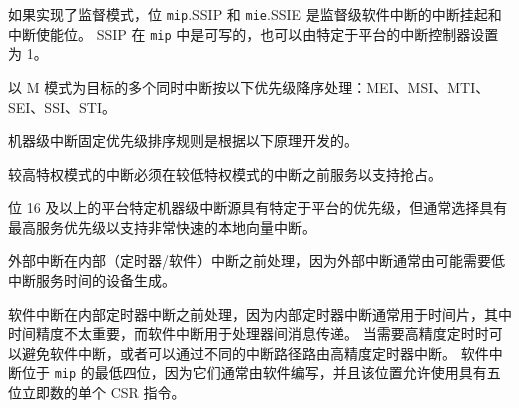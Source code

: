 如果实现了监督模式，位 {\tt mip}.SSIP 和 {\tt mie}.SSIE 是监督级软件中断的中断挂起和中断使能位。 SSIP 在 {\tt mip} 中是可写的，也可以由特定于平台的中断控制器设置为 1。

以 M 模式为目标的多个同时中断按以下优先级降序处理：MEI、MSI、MTI、SEI、SSI、STI。

\iffalse
\begin{commentary}
  The machine-level interrupt fixed-priority ordering rules were developed
  with the following rationale.

  Interrupts for higher privilege modes must be serviced before
  interrupts for lower privilege modes to support preemption.

  The platform-specific machine-level interrupt sources in bits 16 and above
  have platform-specific priority, but are typically chosen to have the
  highest service priority to support very fast local vectored interrupts.

  External interrupts are handled before internal (timer/software)
  interrupts as external interrupts are usually generated by devices
  that might require low interrupt service times.

  Software interrupts are handled before internal timer interrupts,
  because internal timer interrupts are usually intended for time
  slicing, where time precision is less important, whereas software
  interrupts are used for inter-processor messaging.  Software
  interrupts can be avoided when high-precision timing is required, or
  high-precision timer interrupts can be routed via a different
  interrupt path.
  Software interrupts are located in the lowest four bits of {\tt mip}
  as these are often written by software, and this position allows the
  use of a single CSR instruction with a five-bit immediate.
\end{commentary}
\fi

\begin{commentary}

机器级中断固定优先级排序规则是根据以下原理开发的。

较高特权模式的中断必须在较低特权模式的中断之前服务以支持抢占。

位 16 及以上的平台特定机器级中断源具有特定于平台的优先级，但通常选择具有最高服务优先级以支持非常快速的本地向量中断。

外部中断在内部（定时器/软件）中断之前处理，因为外部中断通常由可能需要低中断服务时间的设备生成。

软件中断在内部定时器中断之前处理，因为内部定时器中断通常用于时间片，其中时间精度不太重要，而软件中断用于处理器间消息传递。 当需要高精度定时时可以避免软件中断，或者可以通过不同的中断路径路由高精度定时器中断。 软件中断位于 {\tt mip} 的最低四位，因为它们通常由软件编写，并且该位置允许使用具有五位立即数的单个 CSR 指令。
\end{commentary}

